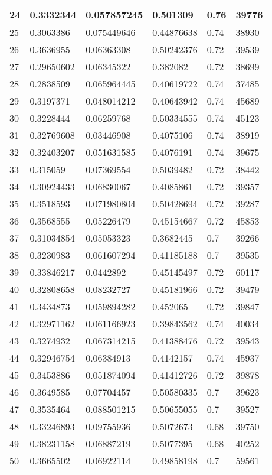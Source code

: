 \begin{longtable}{|l|l|l|l|l|l|}
24 & 0.3332344 & 0.057857245 & 0.501309 & 0.76 & 39776 \\ \hline 
25 & 0.3063386 & 0.075449646 & 0.44876638 & 0.74 & 38930 \\ \hline 
26 & 0.3636955 & 0.06363308 & 0.50242376 & 0.72 & 39539 \\ \hline 
27 & 0.29650602 & 0.06345322 & 0.382082 & 0.72 & 38699 \\ \hline 
28 & 0.2838509 & 0.065964445 & 0.40619722 & 0.74 & 37485 \\ \hline 
29 & 0.3197371 & 0.048014212 & 0.40643942 & 0.74 & 45689 \\ \hline 
30 & 0.3228444 & 0.06259768 & 0.50334555 & 0.74 & 45123 \\ \hline 
31 & 0.32769608 & 0.03446908 & 0.4075106 & 0.74 & 38919 \\ \hline 
32 & 0.32403207 & 0.051631585 & 0.4076191 & 0.74 & 39675 \\ \hline 
33 & 0.315059 & 0.07369554 & 0.5039482 & 0.72 & 38442 \\ \hline 
34 & 0.30924433 & 0.06830067 & 0.4085861 & 0.72 & 39357 \\ \hline 
35 & 0.3518593 & 0.071980804 & 0.50428694 & 0.72 & 39287 \\ \hline 
36 & 0.3568555 & 0.05226479 & 0.45154667 & 0.72 & 45853 \\ \hline 
37 & 0.31034854 & 0.05053323 & 0.3682445 & 0.7 & 39266 \\ \hline 
38 & 0.3230983 & 0.061607294 & 0.41185188 & 0.7 & 39535 \\ \hline 
39 & 0.33846217 & 0.0442892 & 0.45145497 & 0.72 & 60117 \\ \hline 
40 & 0.32808658 & 0.08232727 & 0.45181966 & 0.72 & 39479 \\ \hline 
41 & 0.3434873 & 0.059894282 & 0.452065 & 0.72 & 39847 \\ \hline 
42 & 0.32971162 & 0.061166923 & 0.39843562 & 0.74 & 40034 \\ \hline 
43 & 0.3274932 & 0.067314215 & 0.41388476 & 0.72 & 39543 \\ \hline 
44 & 0.32946754 & 0.06384913 & 0.4142157 & 0.74 & 45937 \\ \hline 
45 & 0.3453886 & 0.051874094 & 0.41412726 & 0.72 & 39878 \\ \hline 
46 & 0.3649585 & 0.07704457 & 0.50580335 & 0.7 & 39623 \\ \hline 
47 & 0.3535464 & 0.088501215 & 0.50655055 & 0.7 & 39527 \\ \hline 
48 & 0.33246893 & 0.09755936 & 0.5072673 & 0.68 & 39750 \\ \hline 
49 & 0.38231158 & 0.06887219 & 0.5077395 & 0.68 & 40252 \\ \hline 
50 & 0.3665502 & 0.06922114 & 0.49858198 & 0.7 & 59561 \\ \hline 
\end{longtable}